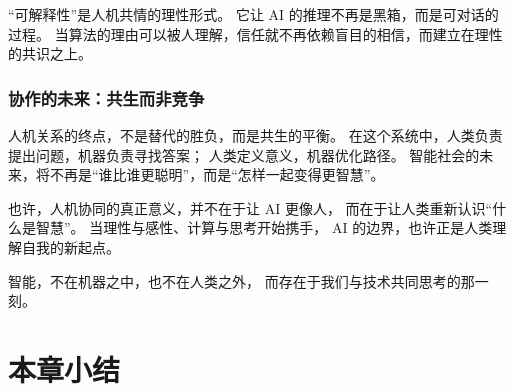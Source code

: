 “可解释性”是人机共情的理性形式。  
它让 AI 的推理不再是黑箱，而是可对话的过程。  
当算法的理由可以被人理解，信任就不再依赖盲目的相信，而建立在理性的共识之上。

\subsubsection{协作的未来：共生而非竞争}

人机关系的终点，不是替代的胜负，而是共生的平衡。  
在这个系统中，人类负责提出问题，机器负责寻找答案；  
人类定义意义，机器优化路径。  
智能社会的未来，将不再是“谁比谁更聪明”，而是“怎样一起变得更智慧”。

也许，人机协同的真正意义，并不在于让 AI 更像人，  
而在于让人类重新认识“什么是智慧”。  
当理性与感性、计算与思考开始携手，  
AI 的边界，也许正是人类理解自我的新起点。

\begin{center}
智能，不在机器之中，也不在人类之外，  
而存在于我们与技术共同思考的那一刻。  
\end{center}

\section{本章小结}